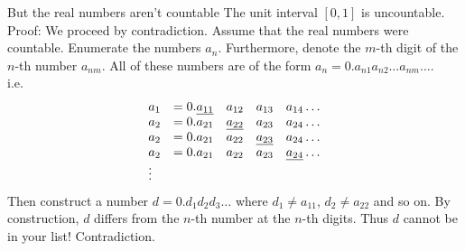 \documentclass{beamer}
\begin{document}
\begin{frame}{But the real numbers aren't countable}
The unit interval $[0, 1]$ is uncountable. \\
Proof:
We proceed by contradiction. Assume that the real numbers were countable.
Enumerate the numbers $a_n$. Furthermore, denote the $m$-th digit of the $n$-th number $a_{nm}.$
All of these numbers are of the form $a_n = 0.a_{n1} a_{n2} \ldots a_{nm} \ldots$.
\\
i.e.
\begin{equation*}
\begin{array}{llllll}
a_{1} &= 0.\emph{a_{11}} &a_{12} &a_{13} &a_{14} \ldots \\
a_{2} &= 0.a_{21} &\emph{a_{22}} &a_{23} &a_{24} \ldots \\
a_{2} &= 0.a_{21} &a_{22} &\emph{a_{23}} &a_{24} \ldots \\
a_{2} &= 0.a_{21} &a_{22} &a_{23} &\emph{a_{24}} \ldots \\
\vdots
\end{array}
\end{equation*}
Then construct a number $d = 0.d_1 d_2 d_3 \ldots$ where $d_1 \ne a_{11}$, $d_2 \ne a_{22}$ and
so on. By construction, $d$ differs from the $n$-th number at the $n$-th digits. Thus $d$ cannot be in your
list! Contradiction.
\end{frame}

\end{document}
